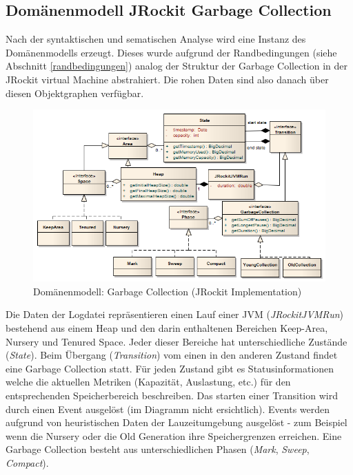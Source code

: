 \subsection{Domänenmodell JRockit Garbage Collection}\label{jrockit_domain_model}
Nach der syntaktischen und sematischen Analyse wird eine Instanz des Domänenmodells erzeugt. Dieses wurde aufgrund der Randbedingungen (siehe Abschnitt \ref{randbedingungen}) analog der Struktur der Garbage Collection in der JRockit virtual Machine abstrahiert. Die rohen Daten sind also danach über diesen Objektgraphen verfügbar. \begin{landscape}
 \begin{figure}[H]
  	\centering
        	\includegraphics[width=18.2cm]{images/jrockit_extension_domain}
	\caption{Domänenmodell: Garbage Collection (JRockit Implementation)}
\end{figure}
\end{landscape}
Die Daten der Logdatei repräsentieren einen Lauf einer JVM (\textit{JRockitJVMRun}) bestehend aus einem Heap und den darin enthaltenen Bereichen Keep-Area, Nursery und Tenured Space. Jeder dieser Bereiche hat unterschiedliche Zustände (\textit{State}). Beim Übergang (\textit{Transition}) vom einen in den anderen Zustand findet eine Garbage Collection statt. Für jeden Zustand gibt es Statusinformationen welche die aktuellen Metriken (Kapazität, Auslastung, etc.) für den entsprechenden Speicherbereich beschreiben. Das starten einer Transition wird durch einen Event ausgelöst (im Diagramm nicht ersichtlich). Events werden aufgrund von heuristischen Daten der Lauzeitumgebung ausgelöst - zum Beispiel wenn die Nursery oder die Old Generation ihre Speichergrenzen erreichen. Eine Garbage Collection besteht aus unterschiedlichen Phasen (\textit{Mark}, \textit{Sweep}, \textit{Compact}).


